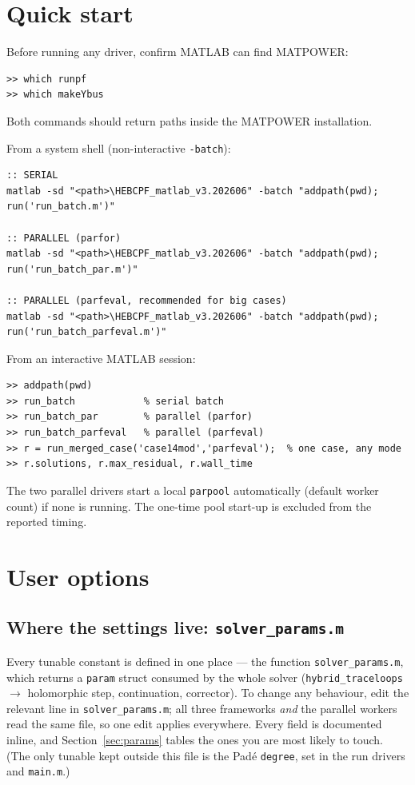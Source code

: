 \documentclass[11pt,a4paper]{article}
\newcommand{\code}[1]{\texttt{#1}}
\begin{document}
\section{Quick start}

Before running any driver, confirm MATLAB can find MATPOWER:
\begin{lstlisting}[style=mat]
>> which runpf
>> which makeYbus
\end{lstlisting}
Both commands should return paths inside the MATPOWER installation.

From a system shell (non-interactive \code{-batch}):
\begin{lstlisting}[style=sh]
:: SERIAL
matlab -sd "<path>\HEBCPF_matlab_v3.202606" -batch "addpath(pwd); run('run_batch.m')"

:: PARALLEL (parfor)
matlab -sd "<path>\HEBCPF_matlab_v3.202606" -batch "addpath(pwd); run('run_batch_par.m')"

:: PARALLEL (parfeval, recommended for big cases)
matlab -sd "<path>\HEBCPF_matlab_v3.202606" -batch "addpath(pwd); run('run_batch_parfeval.m')"
\end{lstlisting}

From an interactive MATLAB session:
\begin{lstlisting}[style=mat]
>> addpath(pwd)
>> run_batch            % serial batch
>> run_batch_par        % parallel (parfor)
>> run_batch_parfeval   % parallel (parfeval)
>> r = run_merged_case('case14mod','parfeval');  % one case, any mode
>> r.solutions, r.max_residual, r.wall_time
\end{lstlisting}

The two parallel drivers start a local \code{parpool} automatically (default worker
count) if none is running. The one-time pool start-up is excluded from the reported
timing.

\section{User options}

\subsection{Where the settings live: \code{solver_params.m}}
Every tunable constant is defined in one place --- the function \code{solver_params.m},
which returns a \code{param} struct consumed by the whole solver (\code{hybrid_traceloops}
$\to$ holomorphic step, continuation, corrector). To change any behaviour, edit the
relevant line in \code{solver_params.m}; all three frameworks \emph{and} the parallel
workers read the same file, so one edit applies everywhere. Every field is documented
inline, and Section~\ref{sec:params} tables the ones you are most likely to touch. (The
only tunable kept outside this file is the Pad\'e \code{degree}, set in the run drivers and
\code{main.m}.)
\end{document}
